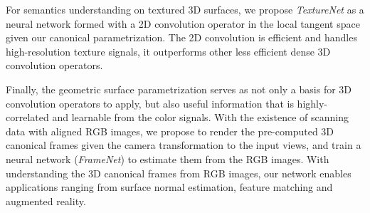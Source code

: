 For semantics understanding on textured 3D surfaces, we propose \emph{TextureNet} as a neural network formed with a 2D convolution operator in the local tangent space given our canonical parametrization.
%
The 2D convolution is efficient and handles high-resolution texture signals, it outperforms other less efficient dense 3D convolution operators.

Finally, the geometric surface parametrization serves as not only a basis for 3D convolution operators to apply, but also useful information that is highly-correlated and learnable from the color signals. With the existence of scanning data with aligned RGB images, we propose to render the pre-computed 3D canonical frames given the camera transformation to the input views, and train a neural network (\emph{FrameNet}) to estimate them from the RGB images. With understanding the 3D canonical frames from RGB images, our network enables applications ranging from surface normal estimation, feature matching and augmented reality. 